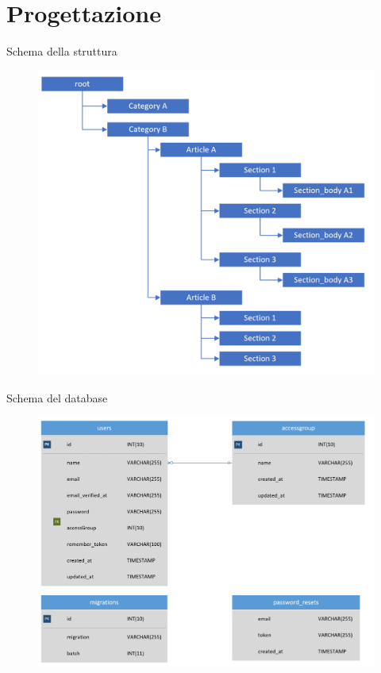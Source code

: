 \documentclass{beamer}
\begin{document}
\section{Progettazione}
\begin{frame}{Schema della struttura}
	\begin{figure}[!h]
		\includegraphics[scale=0.35]{root.png}
	\end{figure}
\end{frame}
\begin{frame}{Schema del database}
	\begin{figure}[!h]
		\includegraphics[scale=0.29]{db_schema1.png}
	\end{figure}
\end{frame}
\end{document}
